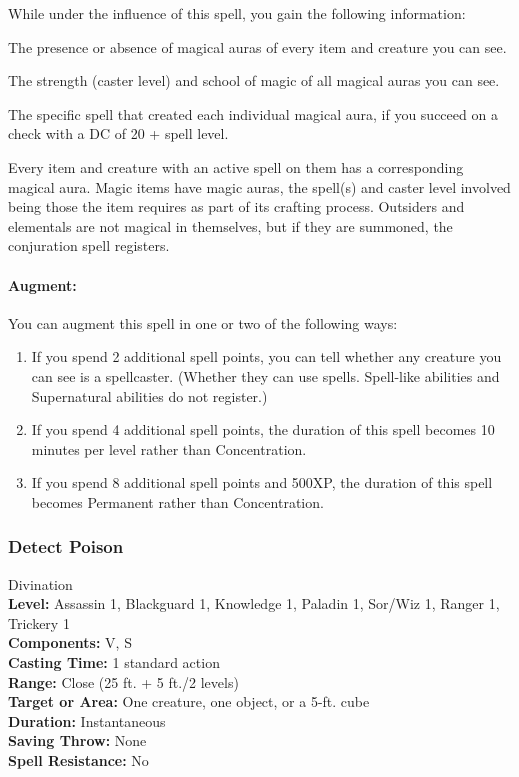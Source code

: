 While under the influence of this spell, you gain the following information:
\begin{list}{}{\leftmargin=1em}
 \item The presence or absence of magical auras of every item and creature you can see.
 \item The strength (caster level) and school of magic of all magical auras you can see.
 \item The specific spell that created each individual magical aura, if you succeed on a  check with a DC of 20 + spell level. 
\end{list}
Every item and creature with an active spell on them has a corresponding magical aura. 
Magic items have magic auras, the spell(s) and caster level involved being those the item requires as part of its crafting process.
Outsiders and elementals are not magical in themselves, but if they are summoned, the conjuration spell registers.

\paragraph{Augment:} You can augment this spell in one or two of the following ways:
\begin{enumerate}
\item If you spend 2 additional spell points, you can tell whether any creature you can see is a spellcaster. (Whether they can use spells. Spell-like abilities and Supernatural abilities do not register.)
\item If you spend 4 additional spell points, the duration of this spell becomes 10 minutes per level rather than Concentration.
\item If you spend 8 additional spell points and 500XP, the duration of this spell becomes Permanent rather than Concentration.
\end{enumerate}
\subsubsection{Detect Poison}
\label{Spell:DetectPoison}
Divination
\\ \textbf{Level:} Assassin 1, Blackguard 1, Knowledge 1, Paladin 1, Sor/Wiz 1, Ranger 1, Trickery 1
\\ \textbf{Components:} V, S
\\ \textbf{Casting Time:} 1 standard action
\\ \textbf{Range:} Close (25 ft. + 5 ft./2 levels)
\\ \textbf{Target or Area:} One creature, one object, or a 5-ft. cube
\\ \textbf{Duration:} Instantaneous
\\ \textbf{Saving Throw:} None
\\ \textbf{Spell Resistance:} No

